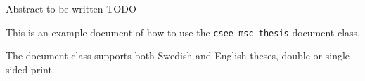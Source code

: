 Abstract to be written TODO

This is an example document of how to use the
\texttt{csee\_msc\_thesis} document class.

The document class supports both Swedish and English theses, double
or single sided print.
